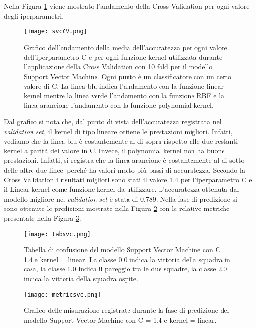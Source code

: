 Nella Figura \ref{fig:svcCV} viene mostrato l'andamento della Cross Validation per ogni valore degli iperparametri.
\begin{figure}[]
	\begin{center}
		\texttt{[image: svcCV.png]}
		\caption{Grafico dell'andamento della media dell'accuratezza per ogni valore dell'iperparametro C e per ogni funzione kernel utilizzata durante l'applicazione della Cross Validation con 10 fold per il modello Support Vector Machine. Ogni punto è un classificatore con un certo valore di C. La linea blu indica l'andamento con la funzione linear kernel mentre la linea verde l'andamento con la funzione RBF e	la linea arancione l'andamento con la funzione polynomial kernel.
		} 
		\label{fig:svcCV}
	\end{center}
\end{figure}
Dal grafico si nota che, dal punto di vista dell'accuratezza registrata nel \emph{validation} \emph{set}, il kernel di tipo lineare ottiene le prestazioni migliori. Infatti, vediamo che la linea blu è costantemente al di sopra rispetto alle due restanti kernel a parità del valore in \textsf{C}. Invece, il polynomial kernel non ha buone prestazioni. Infatti, si registra che la linea arancione è costantemente al di sotto delle altre due linee, perché ha valori molto più bassi di accuratezza. Secondo la Cross Validation i risultati migliori sono stati il valore 1.4 per l'iperparametro \textsf{C} e il Linear kernel come funzione \textsf{kernel} da utilizzare. L'accuratezza ottenuta dal modello migliore nel \emph{validation} \emph{set} è stata di 0.789. Nella fase di predizione si sono ottenute le predizioni mostrate nella Figura \ref{fig:tabsvc} con le relative metriche presentate nella Figura \ref{fig:svcmetrics}.
\begin{figure}[]
	\begin{center}
		\texttt{[image: tabsvc.png]}
		\caption{Tabella di confusione del modello Support Vector Machine con \textsf{C} = 1.4 e \textsf{kernel} = linear. La classe 0.0 indica la vittoria della squadra in casa, la classe 1.0 indica il pareggio tra le due squadre, la classe 2.0 indica la vittoria della squadra ospite.
		} 
		\label{fig:tabsvc}
	\end{center}
\end{figure}
\begin{figure}[]
	\begin{center}
		\texttt{[image: metricsvc.png]}
		\caption{Grafico delle misurazione registrate durante la fase di predizione del modello Support Vector Machine con \textsf{C} = 1.4 e \textsf{kernel} = linear.
		} 
		\label{fig:svcmetrics}
	\end{center}
\end{figure}
